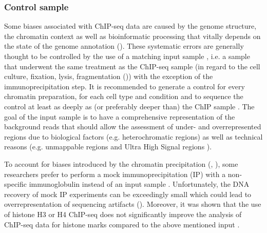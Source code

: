 \subsubsection{Control sample}
Some biases associated with ChIP-seq data are caused by the genome structure, the chromatin context as well as bioinformatic processing that vitally depends on the state of the genome annotation (). These systematic errors are generally thought to be controlled by the use of a matching input sample \citep{Kharchenko2008b, Zhang2008, Park2009, Kidder2011, Ho2011, Chen2012, Landt2012}, i.e. a sample that underwent the same treatment as the ChIP-seq sample (in regard to the cell culture, fixation, lysis, fragmentation ()) with the exception of the immunoprecipitation step. It is recommended to generate a control for every chromatin preparation, for each cell type and condition and to sequence the control at least as deeply as (or preferably deeper than) the ChIP sample \citep{Tuteja2009,Ho2011,Landt2012, Bailey2013}. The goal of the input sample is to have a comprehensive representation of the background reads that should allow the assessment of under- and overrepresented regions due to biological factors (e.g. heterochromatic regions) \citep{Vega2009} as well as technical reasons (e.g. unmappable regions and Ultra High Signal regions \citep{Blacklists}).

To account for biases introduced by the chromatin precipitation (, ), some researchers prefer to perform a mock immunoprecipitation (IP) with a non-specific immunoglobulin instead of an input sample \citep{Landt2012}. Unfortunately, the DNA recovery of mock IP experiments can be exceedingly small which could lead to overrepresentation of sequencing artifacts (). Moreover, it was shown that the use of histone H3 or H4 ChIP-seq does not significantly improve the analysis of ChIP-seq data for histone marks compared to the above mentioned input \citep{Flensburg2014}.
%
